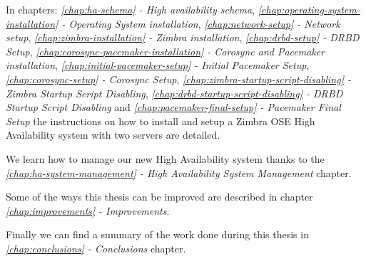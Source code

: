 In chapters: \textit{\ref{chap:ha-schema} - High availability schema},
\textit{\ref{chap:operating-system-installation} - Operating System installation},
\textit{\ref{chap:network-setup} - Network setup},
\textit{\ref{chap:zimbra-installation} - Zimbra installation},
\textit{\ref{chap:drbd-setup} - DRBD Setup},
\textit{\ref{chap:corosync-pacemaker-installation} - Corosync and Pacemaker installation},
\textit{\ref{chap:initial-pacemaker-setup} - Initial Pacemaker Setup},
\textit{\ref{chap:corosync-setup} - Corosync Setup},
\textit{\ref{chap:zimbra-startup-script-disabling} - Zimbra Startup Script Disabling},
\textit{\ref{chap:drbd-startup-script-disabling} - DRBD Startup Script Disabling} and
\textit{\ref{chap:pacemaker-final-setup} - Pacemaker Final Setup} the instructions on how to install and setup a Zimbra OSE High Availability system  with two servers are detailed.

We learn how to manage our new High Availability system thanks to the \textit{\ref{chap:ha-system-management} - High Availability System Management} chapter.

Some of the ways this thesis can be improved are described in chapter \textit{\ref{chap:improvements} - Improvements}.

Finally we can find a summary of the work done during this thesis in \textit{\ref{chap:conclusions} - Conclusions} chapter.

